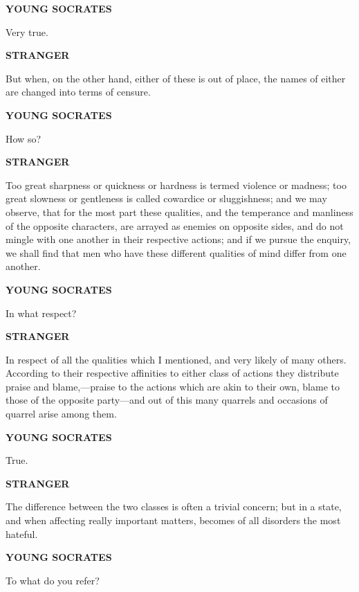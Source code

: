\documentclass[11pt,letter]{article}
\begin{document}
\par \textbf{YOUNG SOCRATES}
\par   Very true.

\par \textbf{STRANGER}
\par   But when, on the other hand, either of these is out of place, the names of either are changed into terms of censure.

\par \textbf{YOUNG SOCRATES}
\par   How so?

\par \textbf{STRANGER}
\par   Too great sharpness or quickness or hardness is termed violence or madness; too great slowness or gentleness is called cowardice or sluggishness; and we may observe, that for the most part these qualities, and the temperance and manliness of the opposite characters, are arrayed as enemies on opposite sides, and do not mingle with one another in their respective actions; and if we pursue the enquiry, we shall find that men who have these different qualities of mind differ from one another.

\par \textbf{YOUNG SOCRATES}
\par   In what respect?

\par \textbf{STRANGER}
\par   In respect of all the qualities which I mentioned, and very likely of many others. According to their respective affinities to either class of actions they distribute praise and blame,—praise to the actions which are akin to their own, blame to those of the opposite party—and out of this many quarrels and occasions of quarrel arise among them.

\par \textbf{YOUNG SOCRATES}
\par   True.

\par \textbf{STRANGER}
\par   The difference between the two classes is often a trivial concern; but in a state, and when affecting really important matters, becomes of all disorders the most hateful.

\par \textbf{YOUNG SOCRATES}
\par   To what do you refer?
\end{document}
